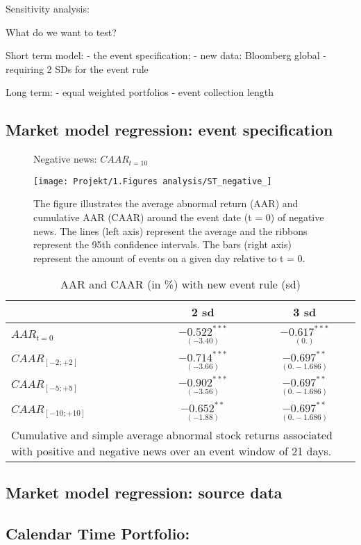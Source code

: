 Sensitivity analysis:

What do we want to test?

Short term model:
- the event specification; 
        - new data: Bloomberg global
        - requiring 2 SDs for the event rule

Long term:
- equal weighted portfolios
- event collection length


\subsection{Market model regression: event specification}

\begin{figure} [H]
    \centering
    \caption{Negative news: $CAAR_{t=10}$}
    \texttt{[image: Projekt/1.Figures analysis/ST\_negative\_]}
     \caption*{\footnotesize The figure illustrates the average abnormal return (AAR) and cumulative AAR (CAAR) around the event date (t = 0) of negative news. The lines (left axis) represent the average and the ribbons represent the 95th confidence intervals. The bars (right axis) represent the amount of events on a given day relative to t = 0. }
    \label{fig:ST_neg_news}
\end{figure} 

\begin{table}[ht]
\centering
\caption{AAR and CAAR (in \%) with new event rule (sd)} 
\begin{tabular}{lcc}
  \hline  \hline
  & 2 sd & 3 sd  \\   
 \hline
$AAR_{t=0}$ & $\underset{(-3.40)}{-0.522^{***}}$ & $\underset{(0.)}{-0.617^{***}}$ \\ 
$CAAR_{[-2;+2]}$  & $\underset{(-3.66)}{-0.714^{***}}$  & $\underset{(0.-1.686)}{-0.697^{**}}$ \\ 
$CAAR_{[-5;+5]}$  & $\underset{(-3.56)}{-0.902^{***}}$  & $\underset{(0.-1.686)}{-0.697^{**}}$ \\ 
$CAAR_{[-10;+10]}$  & $\underset{(-1.88)}{-0.652^{**}}$  & $\underset{(0.-1.686)}{-0.697^{**}}$ \\ 
   \hline \hline
   \multicolumn{3}{p{8cm}}{\footnotesize Cumulative and simple average abnormal stock returns associated with positive and negative news over an event window of 21 days.} \\
   \hline
\end{tabular}
\label{tab:ST_sensitivity}
\end{table}


\subsection{Market model regression: source data}


\subsection{Calendar Time Portfolio: }